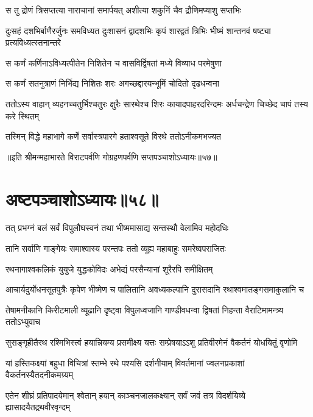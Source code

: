 \twolineshloka
{स तु द्रोणं त्रिसप्तत्या नाराचानां समार्पयत्}
{अशीत्या शकुनिं चैव द्रौणिमप्याशु सप्तभिः}


\threelineshloka
{दुःसहं दशभिर्बाणैरर्जुनः समविध्यत}
{दुःशासनं द्वादशभिः कृपं शारद्वतं त्रिभिः}
{भीष्मं शान्तनवं षष्ट्या प्रत्यविध्यत्स्तनान्तरे}


\twolineshloka
{स कर्णं कर्णिनाऽविध्यत्पीतेन निशितेन च}
{वासविर्द्विषतां मध्ये विव्याध परमेषुणा}


\twolineshloka
{स कर्णं सतनुत्राणं निर्भिद्य निशितः शरः}
{अगच्छद्दारयन्भूमिं चोदितो दृढधन्वना}


\threelineshloka
{ततोऽस्य वाहान् व्यहनच्चतुर्भिश्चतुरः क्षुरैः}
{सारथेश्च शिरः कायादपाहरदरिन्दमः}
{अर्धचन्द्रेण चिच्छेद चापं तस्य करे स्थितम्}


\twolineshloka
{तस्मिन् विद्धे महाभागे कर्णे सर्वास्त्रपारगे}
{हताश्वसूते विरथे ततोऽनीकमभज्यत}

॥इति श्रीमन्महाभारते विराटपर्वणि गोग्रहणपर्वणि सप्तपञ्चाशोऽध्यायः॥५७॥

\chapter{अष्टपञ्चाशोऽध्यायः॥५८॥}

\twolineshloka
{तत् प्रभग्नं बलं सर्वं विपुलौघस्वनं तथा}
{भीष्ममासाद्य सन्तस्थौ वेलामिव महोदधिः}


\twolineshloka
{तानि सर्वाणि गाङ्गेयः समाश्वास्य परन्तपः}
{ततो व्यूह्य महाबाहुः समरेष्वपराजितः}


\twolineshloka
{रथनागाश्वकलिकं युयुजे युद्धकोविदः}
{अभेद्यं परसैन्यानां शूरैरपि समीक्षितम्}


\fourlineindentedshloka
{आचार्यदुर्योधनसूतपुत्रैः}
{कृपेण भीष्मेण च पालितानि}
{अवध्यकल्पानि दुरासदानि}
{रथाश्वमातङ्गसमाकुलानि च}


\fourlineindentedshloka
{तेषामनीकानि किरीटमाली}
{व्यूढानि दृष्ट्वा विपुलध्वजानि}
{गाण्डीवधन्वा द्विषतां निहन्ता}
{वैराटिमामन्त्र्य ततोऽभ्युवाच}


\fourlineindentedshloka
{सुसङ्गृहीतैरथ रश्मिभिस्त्वं}
{हयान्नियम्य प्रसमीक्ष्य यत्तः}
{सम्प्रेषयाऽऽशु प्रतिवीरमेनं}
{वैकर्तनं योधयितुं वृणोमि}


\fourlineindentedshloka
{यां हस्तिकक्ष्यां बहुधा विचित्रां}
{स्तम्भे रथे पश्यसि दर्शनीयाम्}
{विवर्तमानां ज्वलनप्रकाशां}
{वैकर्तनस्यैतदनीकमग्र्यम्}


\fourlineindentedshloka
{एतेन शीघ्रं प्रतिपादयेमान्}
{श्वेतान् हयान् काञ्चनजालकक्ष्यान्}
{सर्वं जवं तत्र विदर्शयिष्ये}
{ह्यासादयैतद्रथवीरवृन्दम्}


